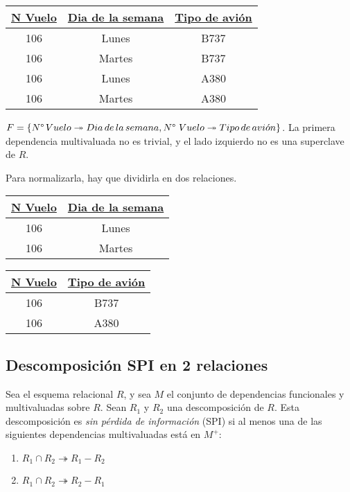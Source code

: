 \documentclass[a4paper, twoside]{article}
\begin{document}
\noindent \begin{center}
\begin{tabular}{|c|c|c|}
\hline 
\uline{N\textdegree{} Vuelo} & \uline{Dia de la semana} & \uline{Tipo de avión}\\
\hline 
\hline 
106 & Lunes & B737\\
\hline 
106 & Martes  & B737\\
\hline 
106 & Lunes & A380\\
\hline 
106 & Martes & A380\\
\hline 
\end{tabular}
\par\end{center}

$F=\left\{ N\text{\textdegree\,}Vuelo\twoheadrightarrow Dia\, de\, la\, semana,N\text{\textdegree\ }Vuelo\twoheadrightarrow Tipo\, de\, avi\acute{o}n\right\} $.
La primera dependencia multivaluada no es trivial, y el lado izquierdo
no es una superclave de $R$.

Para normalizarla, hay que dividirla en dos relaciones.

\noindent \begin{center}
\begin{tabular}{|c|c|}
\hline 
\uline{N\textdegree{} Vuelo} & \uline{Dia de la semana}\\
\hline 
\hline 
106 & Lunes\\
\hline 
106 & Martes \\
\hline 
\end{tabular}%
\begin{tabular}{|c|c|}
\hline 
\uline{N\textdegree{} Vuelo} & \uline{Tipo de avión}\\
\hline 
\hline 
106 & B737\\
\hline 
106 & A380\\
\hline 
\end{tabular}
\par\end{center}


\subsection{Descomposición SPI en 2 relaciones}

Sea el esquema relacional $R$, y sea $M$ el conjunto de dependencias
funcionales y multivaluadas sobre $R$. Sean $R_{1}$ y $R_{2}$ una
descomposición de $R$. Esta descomposición es \emph{sin pérdida de
información} (SPI) si al menos una de las siguientes dependencias
multivaluadas está en $M^{+}$:
\begin{enumerate}
\item $R_{1}\cap R_{2}\twoheadrightarrow R_{1}-R_{2}$
\item $R_{1}\cap R_{2}\twoheadrightarrow R_{2}-R_{1}$
\end{enumerate}
\end{document}
